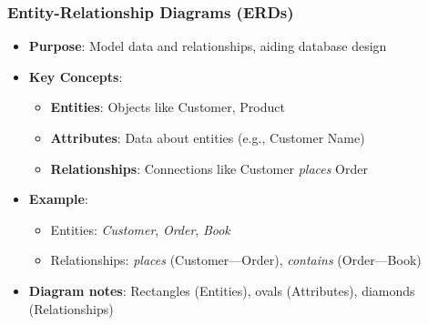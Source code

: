 \documentclass{beamer}
\begin{document}
\begin{frame}[fragile]
    \frametitle{Entity-Relationship Diagrams (ERDs)}
    \begin{itemize}
        \item \textbf{Purpose}: Model data and relationships, aiding database design
        \item \textbf{Key Concepts}:
        \begin{itemize}
            \item \textbf{Entities}: Objects like Customer, Product
            \item \textbf{Attributes}: Data about entities (e.g., Customer Name)
            \item \textbf{Relationships}: Connections like Customer \textit{places} Order
        \end{itemize}
        \item \textbf{Example}: 
        \begin{itemize}
            \item Entities: \textit{Customer}, \textit{Order}, \textit{Book}
            \item Relationships: \textit{places} (Customer—Order), \textit{contains} (Order—Book)
        \end{itemize}
        \item \textbf{Diagram notes}: Rectangles (Entities), ovals (Attributes), diamonds (Relationships)
    \end{itemize}
\end{frame}
\end{document}

